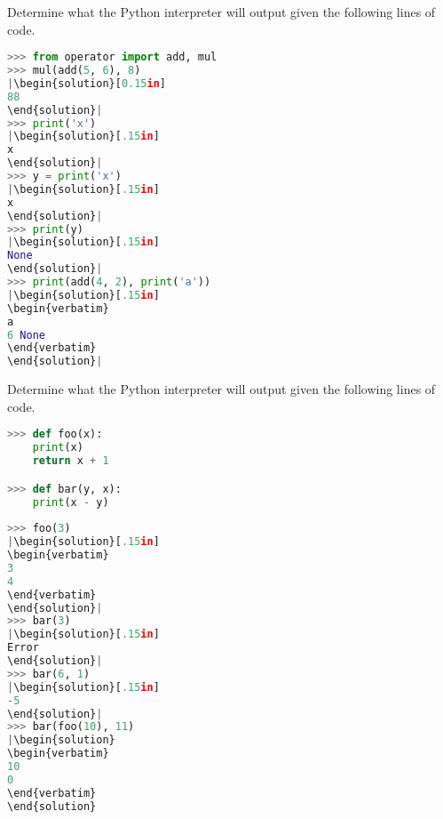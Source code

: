 \question
Determine what the Python interpreter will output given the following lines of code.

\begin{lstlisting}[language=Python]
>>> from operator import add, mul
>>> mul(add(5, 6), 8)
|\begin{solution}[0.15in]
88
\end{solution}|
>>> print('x')
|\begin{solution}[.15in]
x
\end{solution}|
>>> y = print('x')
|\begin{solution}[.15in]
x
\end{solution}|
>>> print(y)
|\begin{solution}[.15in]
None
\end{solution}|
>>> print(add(4, 2), print('a'))
|\begin{solution}[.15in]
\begin{verbatim}
a
6 None
\end{verbatim}
\end{solution}|
\end{lstlisting}
\question
Determine what the Python interpreter will output given the following lines of code.
\begin{lstlisting}[language=Python]
>>> def foo(x):
	print(x)
	return x + 1

>>> def bar(y, x):
	print(x - y)
	
>>> foo(3)
|\begin{solution}[.15in]
\begin{verbatim}
3
4
\end{verbatim}
\end{solution}|
>>> bar(3)
|\begin{solution}[.15in]
Error
\end{solution}|
>>> bar(6, 1)
|\begin{solution}[.15in]
-5
\end{solution}|
>>> bar(foo(10), 11)
|\begin{solution}
\begin{verbatim}
10
0
\end{verbatim}
\end{solution}
\end{lstlisting}
